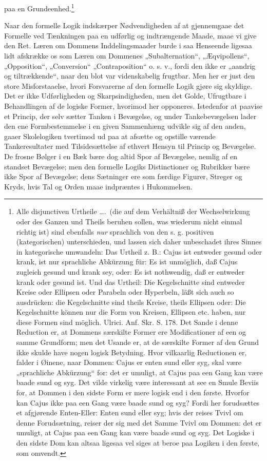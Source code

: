 \documentclass[12pt]{book}
\newcommand{\opage}[1]{\marginnote{\footnotesize\textit{[#1]}}}
\begin{document}
paa en Grundeenhed.\footnote{%
Alle disjunctiven Urtheile \dots.\ (die auf dem Verhältniß der Wechselwirkung
oder des Ganzen und Theils beruhen sollen, was wiederum
nicht einmal richtig ist) sind ebenfalls \emph{nur} sprachlich von den
s. g. positiven (kategorischen) unterschieden, und lassen sich daher
unbeschadet ihres Sinnes in kategorische umwandeln: Das Urtheil
z. B.: Cajus ist entweder gesund oder krank, ist nur sprachliche Abkürzung
für: Es ist unmöglich, daß Cajus zugleich gesund und
krank sey, oder: Es ist nothwendig, daß er entweder krank oder gesund
ist. Und das Urtheil: Die Kegelschnitte sind entweder Kreise
oder Ellipsen oder Parabeln oder Hyperbeln, läßt sich auch so ausdrücken:
die Kegelschnitte sind theils Kreise, theils Ellipsen oder:
Die Kegelschnitte können nur die Form von Kreisen, Ellipsen etc.
haben, nur diese Formen sind möglich. Ulrici. Anf. Skr. S. 178.
Det Sande i denne Reduction er, at Dommens særskilte Former
ere Modificationer af een og samme Grundform; men det Usande
er, at de særskilte Former af den Grund ikke skulde have nogen
logisk Betydning. Hvor vilkaarlig Reductionen er, falder i Øinene,
naar Dommen: Cajus er enten sund eller syg, skal være „sprachliche
Abkürzung“ for: det er umuligt, at Cajus paa een Gang kan være
baade sund og syg. Det vilde virkelig være interessant at see en
Smule Beviis for, at Dommen i den sidste Form er mere logisk
end i den første. Hvorfor kan Cajus ikke paa een Gang være
baade sund og syg? Fordi her forudsættes et afgjørende Enten-Eller:
Enten sund eller syg; hvis der reises Tvivl om denne Forudsætning,
reiser der sig med det Samme Tvivl om Dommen:
det er umuligt, at Cajus paa een Gang kan være baade sund og
syg. Det Logiske i den sidste Dom kan altsaa ligesaa vel siges at
beroe paa Logiken i den første, som omvendt.}

\opage{66}Naar den formelle Logik indskærper Nødvendigheden af
at gjennemgaae det Formelle ved Tænkningen paa en udførlig
og indtrængende Maade, maae vi give den Ret. Læren om
Dommens Inddelingsmaader burde i saa Henseende ligesaa
lidt afskrække os som Læren om Dommenes „Subalternation“,
„Æqvipollens“, „Opposition“, „Conversion“ „Contraposition“
o. s. v., fordi den ikke er „aandrig og tiltrækkende“,
naar den blot var videnskabelig frugtbar. Men her er just
den store Misforstaaelse, hvori Forsvarerne af den formelle
Logik gjøre sig skyldige. Det er ikke Udførligheden og Skarpsindigheden,
men det Golde, Ufrugtbare i Behandlingen af de
logiske Former, hvorimod her opponeres. Istedenfor at paavise
et Princip, der selv sætter Tanken i Bevægelse, og under
Tankebevægelsen lader den ene Formbestemmelse i en given Sammenhæng
udvikle sig af den anden, gaaer Skolelogiken tvertimod
ud paa at afsætte og opstille værende Tankeresultater
med Tilsidesættelse af ethvert Hensyn til Princip og Bevægelse.
De frosne Bølger i en Bæk bære dog altid Spor af Bevægelse,
nemlig af en standset Bevægelse; men den formelle
Logiks Distinctioner og Rubrikker bære ikke Spor af Bevægelse;
dens Sætninger ere som færdige Figurer, Streger og
Kryds, hvis Tal og Orden maae indpræntes i Hukommelsen.
\end{document}

